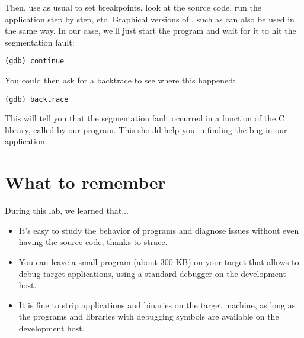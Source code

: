 Then, use  as usual to set breakpoints, look at the source
code, run the application step by step, etc. Graphical versions of
, such as  can also be used in the same way.
In our case, we'll just start the program and wait for it to hit
the segmentation fault:
\begin{verbatim}
(gdb) continue
\end{verbatim}

You could then ask for a backtrace to see where this happened:
\begin{verbatim}
(gdb) backtrace
\end{verbatim}

This will tell you that the segmentation fault occurred in a function
of the C library, called by our program. This should help you in
finding the bug in our application.

\section{What to remember}

During this lab, we learned that...
\begin{itemize}

\item It's easy to study the behavior of programs and diagnose issues
  without even having the source code, thanks to strace.

\item You can leave a small  program (about 300 KB) on your target
  that allows to debug target applications, using a standard 
  debugger on the development host.

\item It is fine to strip applications and binaries on the target
  machine, as long as the programs and libraries with debugging
  symbols are available on the development host.

\end{itemize}
